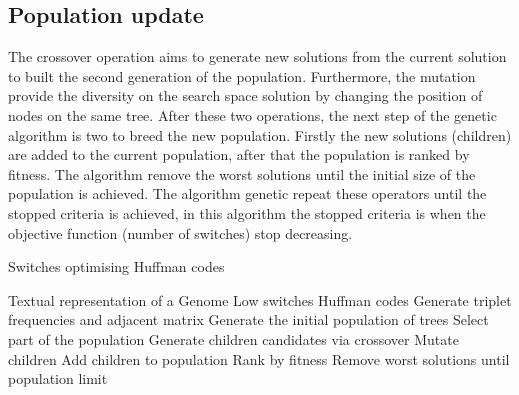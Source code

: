 \documentclass[preprint,12pt]{elsarticle}
\begin{document}
\subsection{Population update}
The crossover operation aims to generate new solutions from the current solution to built the second generation of the population. Furthermore, the mutation provide the diversity on the search space solution by changing the position of  nodes on the same tree. After these two operations, the next step of the genetic algorithm is two to breed the new population. Firstly the new solutions (children) are added to the current population, after that the population is ranked by fitness. The algorithm remove the worst solutions until the initial size of the population is achieved. The algorithm genetic repeat these operators until the stopped criteria is achieved, in this algorithm the stopped criteria is when the objective function (number of switches) stop decreasing.
\begin{algorithm}[!btph]
\caption{Switches optimising Huffman codes}
\label{alg1}
\begin{algorithmic}[1]
\REQUIRE Textual representation of a Genome
\ENSURE Low switches Huffman codes
\STATE Generate triplet frequencies and adjacent matrix 
\STATE Generate the initial  population of trees
\REPEAT 
\STATE Select part of the population
\STATE Generate children candidates via crossover
\STATE Mutate children
\STATE Add children to population
\STATE Rank by fitness
\STATE Remove worst solutions until population limit
\end{algorithmic}
\end{algorithm}
\end{document}
